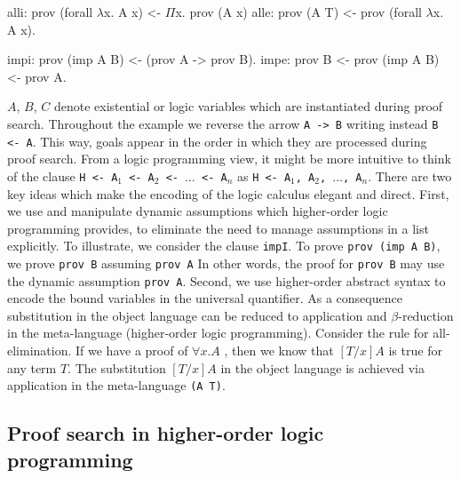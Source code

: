 \documentclass{llncs}
\newcommand{\z}{\mbox{}}
\begin{document}
\hspace{-0.65cm}
\begin{small}
\begin{minipage}[t]{6cm}
\begin{code}
alli: prov (forall $\lambda$x. A x)
      <- $\Pi$x. prov (A x)
alle: prov (A T)
      <- prov (forall $\lambda$x. A x).
 \end{code}
 \end{minipage}
\begin{minipage}[t]{5.5cm}
\begin{code}
impi: prov (imp A B)
      <- (prov A -> prov B).
impe: prov B
      <- prov (imp A B)
      <- prov A.
\end{code}
\end{minipage}
  
\end{small}


$A$, $B$, $C$ denote existential or logic variables which are
instantiated during proof search. Throughout the example we reverse
the arrow {\tt{A -> B}} writing instead {\tt{B <- A}}. This way, goals
appear in the order in which they are processed during proof
search. From a logic programming view, it might be more intuitive to
think of the clause {\tt{H <- A$_1$ <- A$_2$ <- $\ldots$ <- A$_n$}} as
{\tt{H <- A$_1$, A$_2$, $\ldots$, A$_n$}}. There are two key ideas
which make the encoding of the logic calculus elegant and direct.
First, we use and manipulate dynamic assumptions which higher-order
logic programming provides, to eliminate the need to manage
assumptions in a list explicitly. To illustrate, we consider the
clause {\tt impI}. To prove {\tt prov (imp A B)}, we prove {\tt prov
B} assuming {\tt prov A} In other words, the proof for {\tt prov B}
may use the dynamic assumption {\tt prov A}.  Second, we use
higher-order abstract syntax to encode the bound variables in the
universal quantifier. As a consequence substitution in the object
language can be reduced to application and $\beta$-reduction in the
meta-language (higher-order logic programming). Consider the rule for
all-elimination. If we have a proof of $\forall x.A$ , then we know
that $[T/x]A$ is true for any term $T$. The substitution $[T/x]A$ in
the object language is achieved via application in the meta-language
{\tt (A T)}.


\subsection{Proof search in higher-order logic programming}
\end{document}
